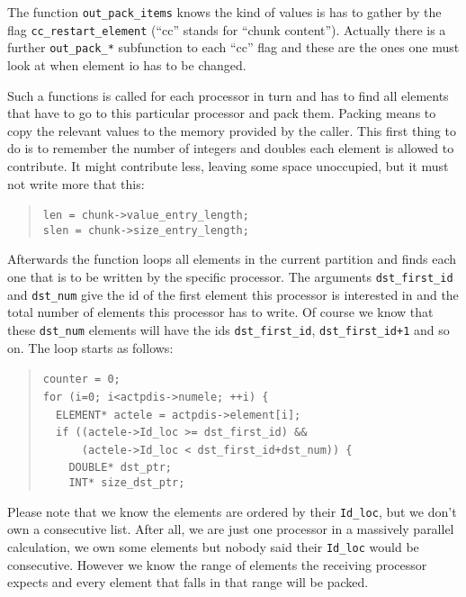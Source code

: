 The function \texttt{out{\_}pack{\_}items} knows the kind of values
is has to gather by the flag \texttt{cc{\_}restart{\_}element}
({}``cc'' stands for {}``chunk content''). Actually there is a
further \texttt{out{\_}pack{\_}{*}} subfunction to each {}``cc''
flag and these are the ones one must look at when element io has to
be changed.

Such a functions is called for each processor in turn and has to find
all elements that have to go to this particular processor and pack
them. Packing means to copy the relevant values to the memory provided
by the caller. This first thing to do is to remember the number of
integers and doubles each element is allowed to contribute. It might
contribute less, leaving some space unoccupied, but it must not write
more that this: 

\begin{quote}
\texttt{len~=~chunk->value{\_}entry{\_}length;~}~\\
 \texttt{slen~=~chunk->size{\_}entry{\_}length; }
\end{quote}
Afterwards the function loops all elements in the current partition
and finds each one that is to be written by the specific processor.
The arguments \texttt{dst{\_}first{\_}id} and \texttt{dst{\_}num}
give the id of the first element this processor is interested in and
the total number of elements this processor has to write. Of course
we know that these \texttt{dst{\_}num} elements will have the ids
\texttt{dst{\_}first{\_}id}, \texttt{dst{\_}first{\_}id+1}
and so on. The loop starts as follows: 

\begin{quote}
\texttt{counter~=~0;~}~\\
 \texttt{for~(i=0;~i<actpdis->numele;~++i)~{\{}~}~\\
 \texttt{~~ELEMENT{*}~actele~=~actpdis->element{[}i];~}~\\
 \texttt{~~if~((actele->Id{\_}loc~>=~dst{\_}first{\_}id)~{\&}{\&}~}~\\
 \texttt{~~~~~~(actele->Id{\_}loc~<~dst{\_}first{\_}id+dst{\_}num))~{\{}~}~\\
 \texttt{~~~~DOUBLE{*}~dst{\_}ptr;~}~\\
 \texttt{~~~~INT{*}~size{\_}dst{\_}ptr; }
\end{quote}
Please note that we know the elements are ordered by their \texttt{Id{\_}loc},
but we don't own a consecutive list. After all, we are just one processor
in a massively parallel calculation, we own some elements but nobody
said their \texttt{Id{\_}loc} would be consecutive. However we know
the range of elements the receiving processor expects and every element
that falls in that range will be packed.

